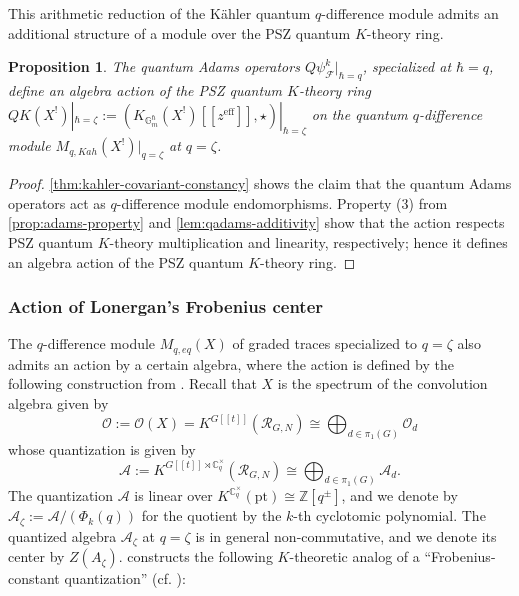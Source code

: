 \documentclass[reqno]{amsart}
\numberwithin{equation}{section}
\numberwithin{equation}{section}
\numberwithin{equation}{section}
\newtheorem{prop}[thm]{Proposition}
\theoremstyle{definition}
\theoremstyle{remark}
\theoremstyle{remark}
\begin{document}
This arithmetic reduction of the K\"ahler quantum $q$-difference module admits an additional structure of a module over the PSZ quantum $K$-theory ring.

\begin{prop}
    The quantum Adams operators $Q\psi^k_{\mathcal{F}}|_{\hbar=q}$, specialized at $\hbar = q$, define an algebra action of the PSZ quantum $K$-theory ring $QK(X^!) |_{\hbar = \zeta} := (K_{\mathbb{G}_m^{\hbar}}(X^!)[\![{z^{\mathrm{eff}}}]\!], \star)|_{\hbar = \zeta}$ on the quantum $q$-difference module $M_{q,Kah}(X^!)|_{q=\zeta}$  at $q = \zeta$. 
\end{prop}
\begin{proof}
    \cref{thm:kahler-covariant-constancy} shows the claim that the quantum Adams operators act as $q$-difference module endomorphisms. Property (3) from \cref{prop:adams-property} and \cref{lem:qadams-additivity} show that the action respects PSZ quantum $K$-theory multiplication and linearity, respectively; hence it defines an algebra action of the PSZ quantum $K$-theory ring.
\end{proof}

\subsubsection{Action of Lonergan's Frobenius center}
The $q$-difference module $M_{q, eq}(X)$ of graded traces specialized to $q=\zeta$ also admits an action by a certain algebra, where the action is defined by the following construction from \cite{lonergan}. Recall that $X$ is the spectrum of the convolution algebra given by
\begin{equation}
    \mathcal{O} := \mathcal{O}(X) =  K^{G[\![t]\!]}(\mathcal{R}_{G, N}) \cong \bigoplus_{d \in \pi_1(G)}\mathcal{O}_d
\end{equation}
whose quantization is given by
\begin{equation}
    \mathcal{A} := K^{G[\![t]\!] \rtimes \mathbb{C}^\times_q}(\mathcal{R}_{G, N}) \cong \bigoplus_{d \in \pi_1(G)}\mathcal{A}_d.
\end{equation}
The quantization $\mathcal{A}$ is linear over $K^{\mathbb{C}^\times_q}(\mathrm{pt}) \cong \mathbb{Z}[q^\pm]$, and we denote by $\mathcal{A}_\zeta := \mathcal{A} / (\Phi_k(q))$ for the quotient by the $k$-th cyclotomic polynomial. The quantized algebra $\mathcal{A}_\zeta$ at $q = \zeta$ is in general non-commutative, and we denote its center by $Z(A_\zeta)$. \cite{lonergan} constructs the following $K$-theoretic analog of a ``Frobenius-constant quantization'' (cf. \cite{bezrukavnikov-kaledin-quantp}):
\end{document}
